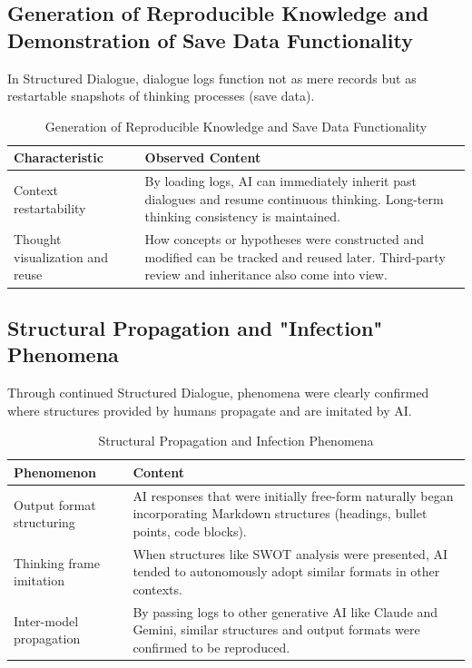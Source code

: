 \documentclass[11pt]{article}
\begin{document}
\subsection{Generation of Reproducible Knowledge and Demonstration of Save Data Functionality}
In Structured Dialogue, dialogue logs function not as mere records but as restartable snapshots of thinking processes (save data).
\begin{table}[htbp]
\centering
\caption{Generation of Reproducible Knowledge and Save Data Functionality}
\begin{tabular}{p{4cm}|p{8cm}}
\hline
\textbf{Characteristic} & \textbf{Observed Content} \\
\hline
Context restartability & By loading logs, AI can immediately inherit past dialogues and resume continuous thinking. Long-term thinking consistency is maintained. \\
\hline
Thought visualization and reuse & How concepts or hypotheses were constructed and modified can be tracked and reused later. Third-party review and inheritance also come into view. \\
\hline
\end{tabular}
\label{tab:reproducible-knowledge}
\end{table}
\subsection{Structural Propagation and "Infection" Phenomena}
Through continued Structured Dialogue, phenomena were clearly confirmed where structures provided by humans propagate and are imitated by AI.

\begin{table}[htbp]
\centering
\caption{Structural Propagation and Infection Phenomena}
\begin{tabular}{p{4cm}|p{8cm}}
\hline
\textbf{Phenomenon} & \textbf{Content} \\
\hline
Output format structuring & AI responses that were initially free-form naturally began incorporating Markdown structures (headings, bullet points, code blocks). \\
\hline
Thinking frame imitation & When structures like SWOT analysis were presented, AI tended to autonomously adopt similar formats in other contexts. \\
\hline
Inter-model propagation & By passing logs to other generative AI like Claude and Gemini, similar structures and output formats were confirmed to be reproduced. \\
\hline
\end{tabular}
\label{tab:structural-infection}
\end{table}
\end{document}
